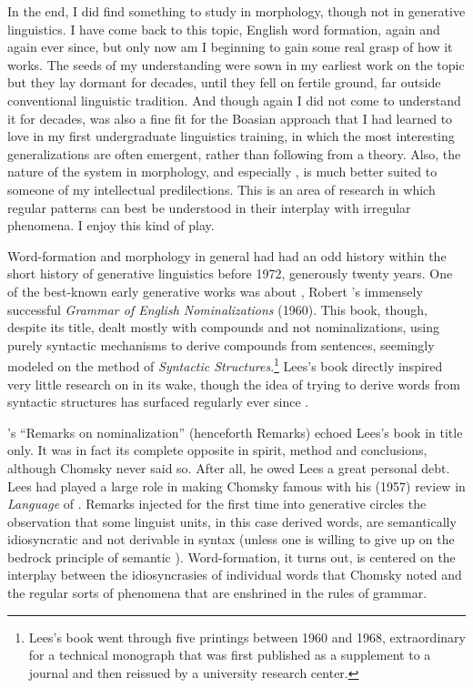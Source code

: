 \documentclass[output=paper]{langsci/langscibook}
\begin{document}
In the end, I did find something to study in morphology, though not in
generative linguistics. I have come back to this topic, English word
formation, again and again ever since, but only now am I beginning to
gain some real grasp of how it works. The seeds of my understanding were
sown in my earliest work on the topic but they lay dormant for decades,
until they fell on fertile ground, far outside conventional linguistic
tradition. And though again I did not come to understand it for decades,
 was also a fine fit for the Boasian approach that I had
learned to love in my first undergraduate linguistics training, in which
the most interesting generalizations are often emergent, rather than
following from a theory. Also, the nature of the system in morphology,
and especially , is much better suited to someone of my
intellectual predilections. This is an area of research in which regular
patterns can best be understood in their interplay with irregular
phenomena. I enjoy this kind of play.

Word-formation and morphology in general had had an odd history within
the short history of generative linguistics before 1972, generously
twenty years. One of the best-known early generative works was about
, Robert 
\citeauthor{Lees60}'s 
immensely successful \emph{Grammar of
English Nominalizations} (1960). This book, though, despite its title,
dealt mostly with compounds and not nominalizations, using purely
syntactic mechanisms to derive compounds from sentences, seemingly
modeled on the method of \emph{Syntactic Structures}.\footnote{Lees's
  book went through five printings between 1960 and 1968, extraordinary
  for a technical monograph that was first published as a supplement to
  a journal and then reissued by a university research center.} Lees's
book directly inspired very little research on  in its
wake, though the idea of trying to derive words from syntactic
structures has surfaced regularly ever since %
\citep{Marchand1969,Hale1993,Pesetsky.1995}%
%
.

\citeauthor{Chomsky1970}'s
 \citeyear{Chomsky1970} ``Remarks on nominalization'' (henceforth Remarks) echoed
Lees's book in title only. It was in fact its complete opposite in
spirit, method and conclusions, although Chomsky never said so. After
all, he owed Lees a great personal debt. Lees had played a large role in
making Chomsky famous with his (1957) review in \emph{Language} of
%
\citet{Chomsky1957}%
%
. Remarks injected for the first time into generative
circles the observation that some linguist units, in this case derived
words, are semantically idiosyncratic and not derivable in syntax
(unless one is willing to give up on the bedrock principle of semantic
). Word-formation, it turns out, is centered on the
interplay between the idiosyncrasies of individual words that Chomsky
noted and the regular sorts of phenomena that are enshrined in the rules
of grammar.
\end{document}
